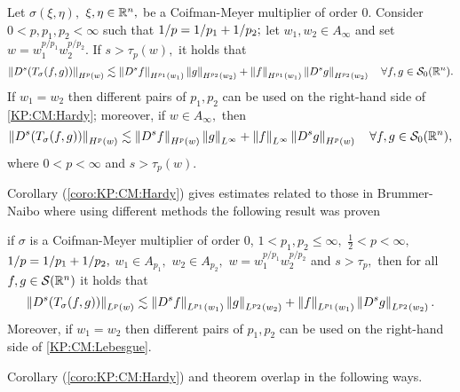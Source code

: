 \begin{corollary}\label{coro:KP:CM:Hardy}  Let $\sigma(\xi,\eta),$ $\xi,\eta\in{{\mathbb R}^n},$ be a Coifman-Meyer multiplier of order $0.$ 
Consider  $0 < p, p_1, p_2  < \infty$  such that $1/p=1/p_1+1/p_2;$ let  $w_1,w_2\in A_\infty$ and set $w=w_1^{{p}/{p_1}} w_2^{{p}/{p_2}}.$ 
If  $s > \tau_p(w),$ it holds that
\begin{equation}\label{KP:CM:Hardy}
\left\|D^s(T_\sigma(f,g))\right\|_{H^p(w)} \lesssim \left\|D^s f\right\|_{H^{p_1}(w_1)} \left\|g\right\|_{H^{p_2}(w_2)} +  \left\|f\right\|_{H^{p_1}(w_1)}   \left\|D^s g\right\|_{H^{p_2}(w_2)} \quad \forall f, g \in {\mathcal{S}_0}({{\mathbb R}^n}).
\end{equation}
If $w_1=w_2$ then different pairs of $p_1, p_2$ can be used on the right-hand side of \eqref{KP:CM:Hardy}; moreover, if $w\in A_\infty,$ then 
\begin{equation}\label{Kp:CM:Hardy2}
\left\|D^s(T_\sigma(f,g))\right\|_{H^p(w)} \lesssim \left\|D^s f\right\|_{H^{p}(w)} \left\|g\right\|_{L^\infty} +  \left\|f\right\|_{L^\infty}   \left\|D^s g\right\|_{H^{p}(w)} \quad \forall f, g \in {\mathcal{S}_0}({{\mathbb R}^n}),
\end{equation}
where $0<p<\infty$ and $s>\tau_{p}(w).$

\end{corollary}

Corollary (\ref{coro:KP:CM:Hardy}) gives estimates related to those in Brummer-Naibo \cite{BrNa2017} where using different methods the following result was proven
\begin{theorem}\label{BrNa2017_THM}
if $\sigma$ is a Coifman-Meyer multiplier of order 0, $1<p_1,p_2\le \infty,$ $\frac{1}{2}<p<\infty,$ $1/p=1/p_1+1/p_2,$  $w_1\in A_{p_1},$ $w_2\in A_{p_2},$ $w=w_1^{{p}/{p_1}} w_2^{{p}/{p_2}}$ and $s>\tau_p,$ then for all $f,g\in {\mathcal{S}}({{\mathbb R}^n})$ it holds that
\begin{equation}\label{KP:CM:Lebesgue}
\left\|D^s(T_\sigma(f,g))\right\|_{L^p(w)} \lesssim \left\|D^s f\right\|_{L^{p_1}(w_1)} \left\|g\right\|_{L^{p_2}(w_2)} +  \left\|f\right\|_{L^{p_1}(w_1)}   \left\|D^s g\right\|_{L^{p_2}(w_2)}. 
\end{equation}
Moreover, if $w_1=w_2$ then different pairs of $p_1, p_2$ can be used on the right-hand side of \eqref{KP:CM:Lebesgue}.
\end{theorem} 

Corollary (\ref{coro:KP:CM:Hardy}) and theorem \label{BrNa2017_THM} overlap in the following ways. 

